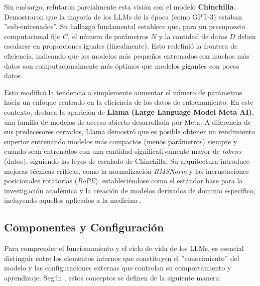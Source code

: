 \documentclass[11pt, a4paper]{article}
\begin{document}
Sin embargo, \cite{hoffmann_training_2022} refutaron parcialmente esta visión con el modelo \textbf{Chinchilla}. Demostraron que la mayoría de los LLMs de la época (como GPT-3) estaban ''sub-entrenados''.
Su hallazgo fundamental establece que, para un presupuesto computacional fijo $C$, el número de parámetros $N$ y la cantidad de datos $D$ deben escalarse en proporciones iguales (linealmente). Esto redefinió 
la frontera de eficiencia, indicando que los modelos más pequeños entrenados con muchos más datos son computacionalmente más óptimos que modelos gigantes con pocos datos.

Esto modificó la tendencia a simplemente aumentar el número de parámetros hacia un enfoque centrado en la eficiencia de los datos de entrenamiento. En este contexto, destaca la aparición de 
\textbf{Llama (Large Language Model Meta AI)}, una familia de modelos de acceso abierto desarrollada por Meta. A diferencia de sus predecesores cerrados, Llama demostró que es posible obtener un rendimiento
superior entrenando modelos más compactos (menos parámetros) siempre y cuando sean entrenados con una cantidad significativamente mayor de \textit{tokens} (datos), siguiendo las leyes de escalado de Chinchilla.
Su arquitectura introduce mejoras técnicas críticas, como la normalización \textit{RMSNorm} y las incrustaciones posicionales rotatorias (\textit{RoPE}), estableciéndose como el estándar base para la investigación
académica y la creación de modelos derivados de dominio específico, incluyendo aquellos aplicados a la medicina \cite{touvron_llama_2023}.

\subsection{Componentes y Configuración}

Para comprender el funcionamiento y el ciclo de vida de los LLMs, es esencial distinguir entre los elementos internos que constituyen el ''conocimiento'' del modelo y las configuraciones externas que controlan
su comportamiento y aprendizaje. Según \cite{atkinson2025}, estos conceptos se definen de la siguiente manera:
\end{document}

